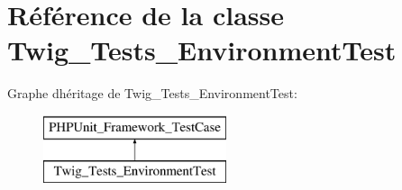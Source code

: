 \hypertarget{class_twig___tests___environment_test}{}\section{Référence de la classe Twig\+\_\+\+Tests\+\_\+\+Environment\+Test}
\label{class_twig___tests___environment_test}
Graphe d\textquotesingle{}héritage de Twig\+\_\+\+Tests\+\_\+\+Environment\+Test\+:\begin{figure}[H]
\begin{center}
\leavevmode
\includegraphics[height=2.000000cm]{class_twig___tests___environment_test}
\end{center}
\end{figure}

